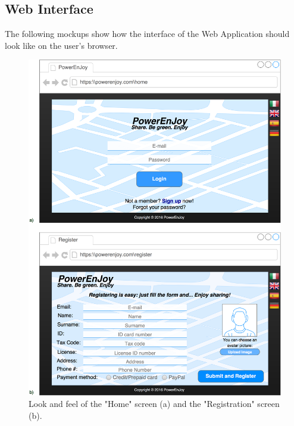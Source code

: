 \subsection{Web Interface}
The following mockups show how the interface of the Web Application should look like on the user's browser.

\begin{figure}[H]
\centering
		\includegraphics[width=\textwidth]{./user_interface_design/diagrams/web_login_register.png}
		\caption{Look and feel of the "Home" screen (a) and the "Registration" screen (b).}
		\label{web_login_register}
\end{figure}

